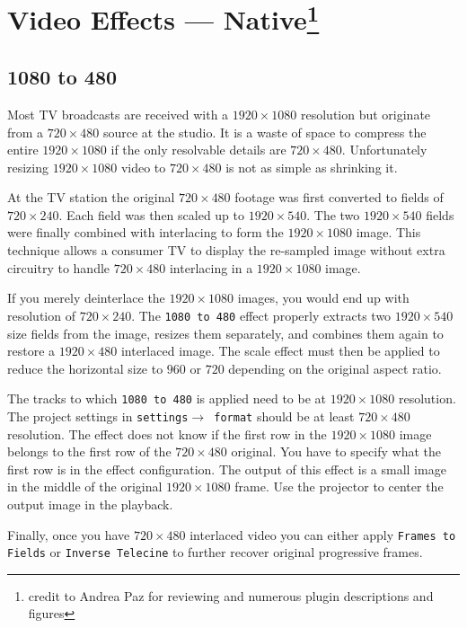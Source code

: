 \section[Video Effects --- Native]{Video Effects --- Native\protect\footnote{credit to Andrea Paz for reviewing and numerous plugin descriptions and figures}}%
\label{sec:video_effects_native}

\subsection{1080 to 480}%
\label{sub:1080_to_480}

Most TV broadcasts are received with a $1920\times1080$ resolution but originate from a $720\times480$ source at the studio. It is a waste of space to compress the entire $1920\times1080$ if the only resolvable details are $720\times480$. Unfortunately resizing $1920\times1080$ video to $720\times480$ is not as simple as shrinking it.

At the TV station the original $720\times480$ footage was first converted to fields of $720\times240$. Each field was then scaled up to $1920\times540$. The two $1920\times540$ fields were finally combined with interlacing to form the $1920\times1080$ image. This technique allows a consumer TV to display the re-sampled image without extra circuitry to handle $720\times480$ interlacing in a $1920\times1080$ image.

If you merely deinterlace the $1920\times1080$ images, you would end up with resolution of $720\times240$. The \texttt{1080 to 480} effect properly extracts two $1920\times540$ size fields from the image, resizes them separately, and combines them again to restore a $1920\times480$ interlaced image. The scale effect must then be applied to reduce the horizontal size to $960$ or $720$ depending on the original aspect ratio.

The tracks to which \texttt{1080 to 480} is applied need to be at $1920\times1080$ resolution. The project settings in \texttt{settings$\rightarrow$ format} should be at least $720\times480$ resolution. The effect does not know if the first row in the $1920\times1080$ image belongs to the first row of the $720\times480$ original. You have to specify what the first row is in the effect configuration. The output of this effect is a small image in the middle of the original $1920\times1080$ frame. Use the projector to center the output image in the playback.

Finally, once you have $720\times480$ interlaced video you can either apply \texttt{Frames to Fields} or \texttt{Inverse Telecine} to further recover original progressive frames.

